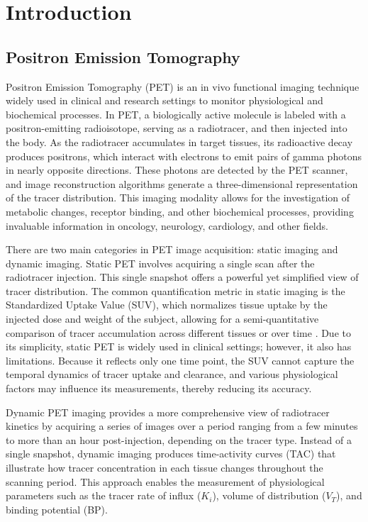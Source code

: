 \chapter{Introduction}
\section{Positron Emission Tomography}
Positron Emission Tomography (PET) is an in vivo functional imaging technique widely used in clinical and research settings to monitor physiological and biochemical processes.
In PET, a biologically active molecule is labeled with a positron-emitting radioisotope, serving as a radiotracer, and then injected into the body.
As the radiotracer accumulates in target tissues, its radioactive decay produces positrons, which interact with electrons to emit pairs of gamma photons in nearly opposite directions.
These photons are detected by the PET scanner, and image reconstruction algorithms generate a three-dimensional representation of the tracer distribution.
This imaging modality allows for the investigation of metabolic changes, receptor binding, and other biochemical processes, providing invaluable information in oncology, neurology, cardiology, and other fields.

There are two main categories in PET image acquisition: static imaging and dynamic imaging.
Static PET involves acquiring a single scan after the radiotracer injection.
This single snapshot offers a powerful yet simplified view of tracer distribution.
The common quantification metric in static imaging is the Standardized Uptake Value (SUV), which normalizes tissue uptake by the injected dose and weight of the subject, allowing for a semi-quantitative comparison of tracer accumulation across different tissues or over time \cite{keyes1995suv}.
Due to its simplicity, static PET is widely used in clinical settings; however, it also has limitations.
Because it reflects only one time point, the SUV cannot capture the temporal dynamics of tracer uptake and clearance, and various physiological factors may influence its measurements, thereby reducing its accuracy.

Dynamic PET imaging provides a more comprehensive view of radiotracer kinetics by acquiring a series of images over a period ranging from a few minutes to more than an hour post-injection, depending on the tracer type.
Instead of a single snapshot, dynamic imaging produces time-activity curves (TAC) that illustrate how tracer concentration in each tissue changes throughout the scanning period.
This approach enables the measurement of physiological parameters such as the tracer rate of influx (\(K_i\)), volume of distribution (\(V_T\)), and binding potential (BP). %

